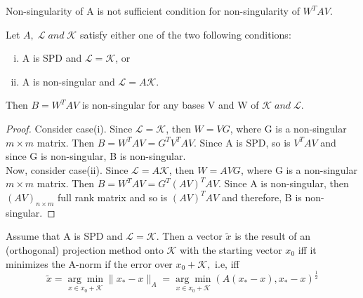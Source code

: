 \documentclass[10pt,a4paper]{article}
\begin{document}
Non-singularity of A is not sufficient condition for non-singularity of $W^TAV$.

\begin{prop}
Let $A,\;\mathcal{L}\;and\;\mathcal{K}$ satisfy either one of the two following conditions:
\begin{enumerate}[i.]
\item A is SPD and $\mathcal{L}=\mathcal{K}$, or
\item A is non-singular and $\mathcal{L}=A\mathcal{K}$.
\end{enumerate}
Then $B=W^TAV$ is non-singular for any bases V and W of $\mathcal{K}\;and\;\mathcal{L}$.
\end{prop}

\begin{proof}
Consider case(i). Since $\mathcal{L}=\mathcal{K}$, then $W=VG$, where G is a non-singular $m\times m$ matrix. Then $B=W^TAV={G^T}V^TAV$. Since A is SPD, so is $V^TAV$ and since G is non-singular, B is non-singular. \\
Now, consider case(ii). Since $\mathcal{L}=A\mathcal{K}$, then $W=AVG$, where G is a non-singular $m\times m$ matrix. Then $B=W^TAV={G^T}(AV)^TAV$. Since A is non-singular, then $(AV)_{n\times m }$ full rank matrix and so is $(AV)^TAV$ and therefore, B is non-singular.
\end{proof}

\begin{theorem}
Assume that A is SPD and $\mathcal{L}=\mathcal{K}.$ Then a vector $\tilde{x}$ is the result of an (orthogonal) projection method onto $\mathcal{K}$ with the  starting vector $x_0$ iff it minimizes the A-norm if the error over $x_0+\mathcal{K},$ i.e, iff
$$\tilde{x} = \underset{x\in x_0+\mathcal{K}}{\arg\min}\|x_*-x\|_A=\underset{x\in x_0+\mathcal{K}}{\arg\min}(A(x_*-x),x_*-x)^{\frac{1}{2}}$$
\end{theorem}
\end{document}
